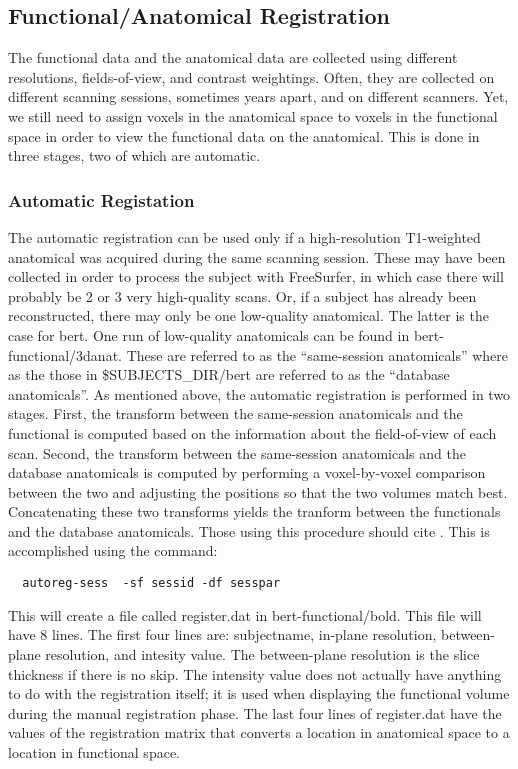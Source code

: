 \documentclass[12pt]{article}
\begin{document}
\subsection{Functional/Anatomical Registration}

The functional data and the anatomical data are collected using
different resolutions, fields-of-view, and contrast weightings. Often,
they are collected on different scanning sessions, sometimes years
apart, and on different scanners. Yet, we still need to assign voxels
in the anatomical space to voxels in the functional space in order to
view the functional data on the anatomical.  This is done in three
stages, two of which are automatic.

\subsubsection{Automatic Registation}

The automatic registration can be used only if a high-resolution
T1-weighted anatomical was acquired during the same scanning
session. These may have been collected in order to process the subject
with FreeSurfer, in which case there will probably be 2 or 3 very
high-quality scans. Or, if a subject has already been reconstructed,
there may only be one low-quality anatomical. The latter is the case
for bert. One run of low-quality anatomicals can be found in
bert-functional/3danat.  These are referred to as the ``same-session
anatomicals'' where as the those in \$SUBJECTS\_DIR/bert are referred
to as the ``database anatomicals''. As mentioned above, the automatic
registration is performed in two stages. First, the transform between
the same-session anatomicals and the functional is computed based on
the information about the field-of-view of each scan. Second, the
transform between the same-session anatomicals and the database
anatomicals is computed by performing a voxel-by-voxel comparison
between the two and adjusting the positions so that the two volumes
match best. Concatenating these two transforms yields the tranform
between the functionals and the database anatomicals.  Those using
this procedure should cite \cite{Collins94}.  This is accomplished
using the command:

\begin{verbatim}
  autoreg-sess  -sf sessid -df sesspar 
\end{verbatim}

This will create a file called register.dat in
bert-functional/bold. This file will have 8 lines. The first four
lines are: subjectname, in-plane resolution, between-plane resolution,
and intesity value. The between-plane resolution is the slice
thickness if there is no skip. The intensity value does not actually
have anything to do with the registration itself; it is used when
displaying the functional volume during the manual registration
phase. The last four lines of register.dat have the values of the
registration matrix that converts a location in anatomical space to a
location in functional space.
\end{document}

